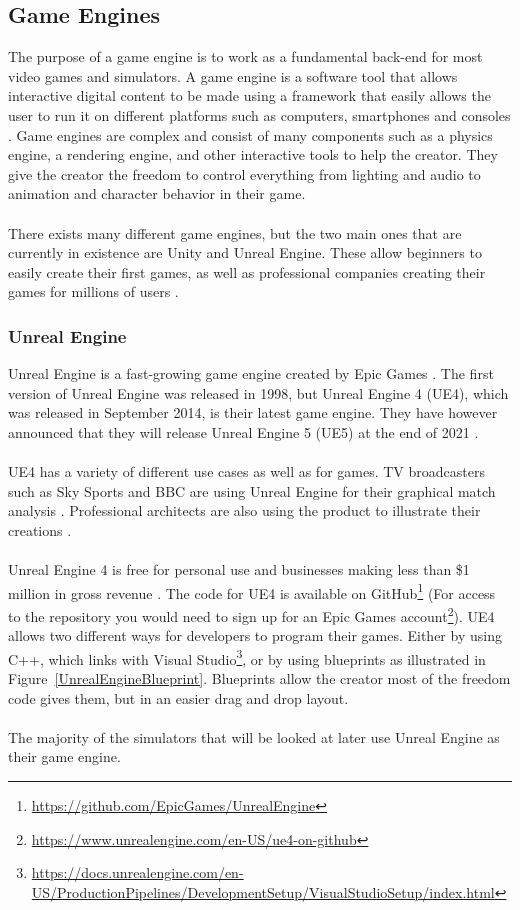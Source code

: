 \subsection{Game Engines} \label{GameEngines}
The purpose of a game engine is to work as a fundamental back-end for most video games and simulators. A game engine is a software tool that allows interactive digital content to be made using a framework that easily allows the user to run it on different platforms such as computers, smartphones and consoles \cite{GameEngine_UnityGame_book}. Game engines are complex and consist of many components such as a physics engine, a rendering engine, and other interactive tools to help the creator. They give the creator the freedom to control everything from lighting and audio to animation and character behavior in their game.
\\~\\
There exists many different game engines, but the two main ones that are currently in existence are Unity and Unreal Engine. These allow beginners to easily create their first games, as well as professional companies creating their games for millions of users \cite{GamesMadeInUnity, GamesMadeInUnrealEngine}.

\subsubsection{Unreal Engine}
Unreal Engine is a fast-growing game engine created by Epic Games \cite{UnrealEngine_Book}. The first version of Unreal Engine was released in 1998, but Unreal Engine 4 (UE4), which was released in September 2014, is their latest game engine. They have however announced that they will release Unreal Engine 5 (UE5) at the end of 2021 \cite{UE5}. 
\\~\\
UE4 has a variety of different use cases as well as for games. TV broadcasters such as Sky Sports and BBC are using Unreal Engine for their graphical match analysis \cite{UnrealEngine_LiveBroadcast}. Professional architects are also using the product to illustrate their creations \cite{UnrealEngine_Automative}.   
\\~\\
Unreal Engine 4 is free for personal use and businesses making less than \$1 million in gross revenue \cite{UE5}. The code for UE4 is available on GitHub\footnote{\url{https://github.com/EpicGames/UnrealEngine}} (For access to the repository you would need to sign up for an Epic Games account\footnote{\url{https://www.unrealengine.com/en-US/ue4-on-github}}). UE4 allows two different ways for developers to program their games. Either by using C++, which links with Visual Studio\footnote{\url{https://docs.unrealengine.com/en-US/ProductionPipelines/DevelopmentSetup/VisualStudioSetup/index.html}}, or by using blueprints as illustrated in Figure~\ref{UnrealEngineBlueprint}. Blueprints allow the creator most of the freedom code gives them, but in an easier drag and drop layout.
\\~\\
The majority of the simulators that will be looked at later use Unreal Engine as their game engine. 

